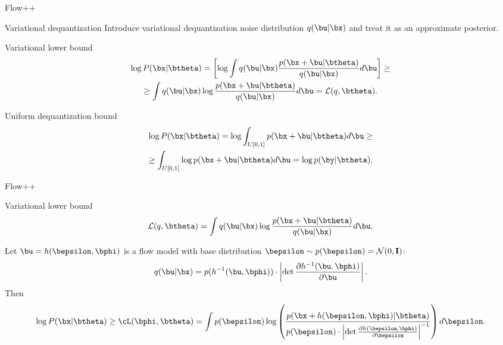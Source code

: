 \begin{frame}{Flow++}
	\begin{block}{Variational dequantization}
		Introduce variational dequantization noise distribution $q(\bu | \bx)$ and treat it as an approximate posterior. 
	\end{block}
	\begin{block}{Variational lower bound}
		\vspace{-0.7cm}
		\begin{multline*}
		 \log P(\bx | \btheta) = \left[ \log \int q(\bu | \bx) \frac{p(\bx + \bu | \btheta)}{q(\bu | \bx)} d \bu \right] \geq \\ 
			\geq  \int q(\bu | \bx) \log \frac{p(\bx + \bu | \btheta)}{q(\bu | \bx)} d \bu = \mathcal{L}(q, \btheta).
		\end{multline*}
	\end{block}
	\vspace{-0.5cm}
	\begin{block}{Uniform dequantization bound}
		\vspace{-0.7cm}
		\begin{multline*}
		 \log P(\bx | \btheta) = \log \int_{U[0, 1]} p(\bx + \bu | \btheta) d \bu \geq \\ \geq \int_{U[0, 1]} \log p(\bx + \bu | \btheta) d \bu = \log p(\by | \btheta).
		\end{multline*}
	\end{block}
\end{frame}
\begin{frame}{Flow++}
	\begin{block}{Variational lower bound}
		\[
		\mathcal{L}(q, \btheta) = \int q(\bu | \bx) \log \frac{p(\bx + \bu | \btheta)}{q(\bu | \bx)} d \bu.
		\]
	\end{block}
	Let $\bu = h(\bepsilon, \bphi)$ is a flow model with base distribution $\bepsilon \sim p(\bepsilon) = \mathcal{N}(0, \mathbf{I})$:
	\vspace{-0.3cm}
	\[
		q(\bu | \bx) = p(h^{-1}(\bu, \bphi)) \cdot \left| \det \frac{\partial h^{-1}(\bu, \bphi)}{\partial \bu}\right|.
	\]
	\vspace{-0.3cm}
	Then
	\[
		\log P(\bx | \btheta) \geq \cL(\bphi, \btheta) = \int p(\bepsilon) \log \left( \frac{p(\bx + h(\bepsilon, \bphi) | \btheta)}{p(\bepsilon) \cdot \left| \det \frac{\partial h(\bepsilon, \bphi)}{\partial \bepsilon}\right|^{-1}} \right) d\bepsilon.
	\]
\end{frame}
